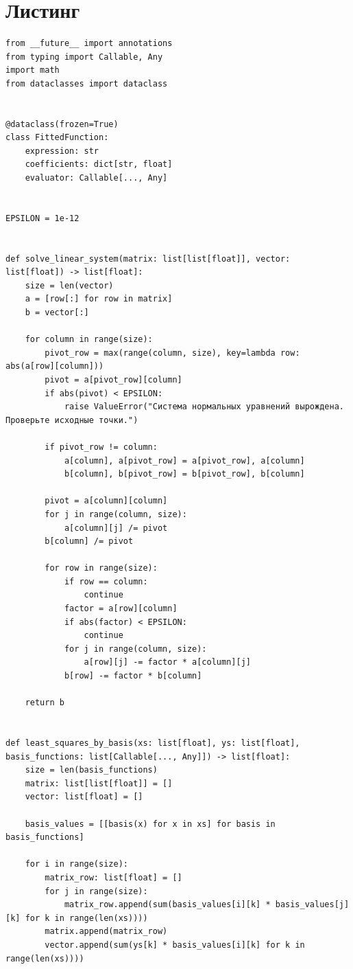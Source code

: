 \documentclass[a4paper,14pt]{extarticle}
\begin{document}
\section{Листинг}
\begin{lstlisting}[style=pythonstyle, caption={Модуль вычислительных методов аппроксимации (approximation\_methods.py)}, label={lst:approximation_methods}]
from __future__ import annotations
from typing import Callable, Any
import math
from dataclasses import dataclass


@dataclass(frozen=True)
class FittedFunction:
    expression: str
    coefficients: dict[str, float]
    evaluator: Callable[..., Any]


EPSILON = 1e-12


def solve_linear_system(matrix: list[list[float]], vector: list[float]) -> list[float]:
    size = len(vector)
    a = [row[:] for row in matrix]
    b = vector[:]

    for column in range(size):
        pivot_row = max(range(column, size), key=lambda row: abs(a[row][column]))
        pivot = a[pivot_row][column]
        if abs(pivot) < EPSILON:
            raise ValueError("Система нормальных уравнений вырождена. Проверьте исходные точки.")

        if pivot_row != column:
            a[column], a[pivot_row] = a[pivot_row], a[column]
            b[column], b[pivot_row] = b[pivot_row], b[column]

        pivot = a[column][column]
        for j in range(column, size):
            a[column][j] /= pivot
        b[column] /= pivot

        for row in range(size):
            if row == column:
                continue
            factor = a[row][column]
            if abs(factor) < EPSILON:
                continue
            for j in range(column, size):
                a[row][j] -= factor * a[column][j]
            b[row] -= factor * b[column]

    return b


def least_squares_by_basis(xs: list[float], ys: list[float], basis_functions: list[Callable[..., Any]]) -> list[float]:
    size = len(basis_functions)
    matrix: list[list[float]] = []
    vector: list[float] = []

    basis_values = [[basis(x) for x in xs] for basis in basis_functions]

    for i in range(size):
        matrix_row: list[float] = []
        for j in range(size):
            matrix_row.append(sum(basis_values[i][k] * basis_values[j][k] for k in range(len(xs))))
        matrix.append(matrix_row)
        vector.append(sum(ys[k] * basis_values[i][k] for k in range(len(xs))))


\end{lstlisting}
\end{document}
